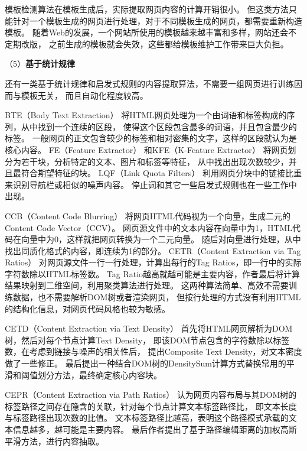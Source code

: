 模板检测算法在模板生成后，实际提取网页内容的计算开销很小。
但这类方法只能针对一个模板生成的网页进行处理，对于不同模板生成的网页，都需要重新构造模板。
随着Web的发展，一个网站所使用的模板越来越丰富和多样，网站还会不定期改版，
之前生成的模板就会失效，这些都给模板维护工作带来巨大负担。

（5）\textbf{基于统计规律}

还有一类基于统计规律和启发式规则的内容提取算法，不需要一组网页进行训练因而与模板无关，
而且自动化程度较高。

BTE（Body Text Extraction）
将HTML网页处理为一个由词语和标签构成的序列，从中找到一个连续的区段，
使得这个区段包含最多的词语，并且包含最少的标签。
一般网页的正文包含较少的标签和相对密集的文字，这样的区段就认为是核心内容。
FE（Feature Extractor）
和KFE（K-Feature Extractor）
将网页划分为若干块，分析特定的文本、图片和标签等特征，
从中找出出现次数较少，并且最符合期望特征的块。
LQF（Link Quota Filters）
利用网页分块中的链接比重来识别导航栏或相似的噪声内容。
停止词和其它一些启发式规则也在一些工作中出现。

CCB（Content Code Blurring）
将网页HTML代码视为一个向量，生成二元的Content Code Vector（CCV）。
网页源文件中的文本内容在向量中为1，HTML代码在向量中为0，这样就把网页转换为一个二元向量。
随后对向量进行处理，从中找出同质化格式的内容，即连续为1的部分。
CETR（Content Extraction via Tag Ratios）
对网页源文件一行一行处理，计算出每行的Tag Ratios，即一行中的实际字符数除以HTML标签数。
Tag Ratio越高就越可能是主要内容，作者最后将计算结果映射到二维空间，利用聚类算法进行处理。
这两种算法简单、高效不需要训练数据，也不需要解析DOM树或者渲染网页，
但按行处理的方式没有利用HTML的结构化信息，对网页代码风格也较为敏感。

CETD（Content Extraction via Text Density）
首先将HTML网页解析为DOM树，然后对每个节点计算Text Density，
即该DOM节点包含的字符数除以标签数，在考虑到链接与噪声的相关性后，
提出Composite Text Density，对文本密度做了一些修正。
最后提出一种结合DOM树的DensitySum计算方式替换常用的平滑和阈值划分方法，最终确定核心内容块。

CEPR（Content Extraction via Path Ratios）
认为网页内容布局与其DOM树的标签路径之间存在隐含的关联，针对每个节点计算文本标签路径比，
即文本长度与标签路径出现次数的比值。
文本标签路径比越高，表明这个路径模式承载的文本信息越多，越可能是主要内容。
最后作者提出了基于路径编辑距离的加权高斯平滑方法，进行内容抽取。

